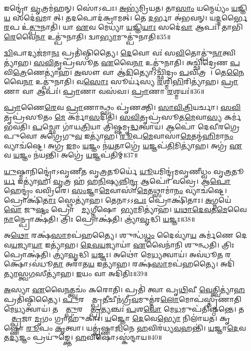𑌇𑌨𑍍𑌦𑍍𑌰𑍋॑ \ul{𑌵𑍃}𑌤𑍍𑌰𑌮॑𑌹𑌨𑍍।
𑌸𑍋॑𑌽𑌪𑌃।
\ul{𑌅}𑌭𑍍𑌯॑𑌮𑍍𑌰𑌿𑌯𑌤।
𑌤𑌾\ul{𑌸𑌾𑌂} 𑌯𑌨𑍍𑌮𑍇𑌧𑍍𑌯𑌂॑ \ul{𑌯}𑌜𑍍𑌞𑌿\ul{𑌯}\ul{} 𑌸𑌦𑍇॑\ul{𑌵}𑌮𑌾𑌸𑍀᳚𑌤𑍍।
𑌤𑌦𑌪𑍋𑌦॑𑌕𑍍𑌰𑌾𑌮𑌤𑍍।
𑌤𑍇 \ul{𑌦}𑌰𑍍𑌭𑌾 𑌅॑𑌭𑌵𑌨𑍍।
𑌯\ul{𑌦𑍍𑌦}𑌰𑍍𑌭𑍈\ul{𑌰}𑌪 𑌉॑\ul{𑌤𑍍𑌪𑍁}𑌨𑌾𑌤𑌿॑।
𑌯𑌾 \ul{𑌏}𑌵 𑌮𑍇𑌧𑍍𑌯𑌾॑ \ul{𑌯}𑌜𑍍𑌞𑌿\ul{𑌯𑌾𑌃} 𑌸𑌦𑍇॑\ul{𑌵𑌾} 𑌆𑌪𑌃॑।
𑌤𑌾𑌭𑌿॑\ul{𑌰𑍇}𑌵𑍈\ul{𑌨𑌾} 𑌉𑌤𑍍𑌪𑍁॑𑌨𑌾𑌤𑌿।
𑌦𑍍𑌵𑌾\ul{𑌭𑍍𑌯𑌾}𑌮𑍁𑌤𑍍𑌪𑍁॑𑌨𑌾𑌤𑌿॥35॥

\ul{𑌦𑍍𑌵𑌿}𑌪𑌾𑌦𑍍𑌯𑌜॑𑌮𑌾\ul{𑌨𑌃} 𑌪𑍍𑌰𑌤𑌿॑\-𑌷𑍍𑌠𑌿𑌤𑍍𑌯𑍈।
\ul{𑌦𑍇}𑌵𑍋 𑌵𑌃॑ 𑌸\ul{𑌵𑌿}𑌤𑍋𑌤𑍍𑌪𑍁॑\ul{𑌨𑌾}𑌤𑍍𑌵𑌿𑌤𑍍𑌯𑌾॑𑌹।
\ul{𑌸}\ul{𑌵𑌿}𑌤𑍃𑌪𑍍𑌰॑𑌸𑍂𑌤 \ul{𑌏}𑌵𑍈\ul{𑌨𑌾} 𑌉𑌤𑍍𑌪𑍁॑𑌨𑌾𑌤𑌿।
𑌅𑌚𑍍𑌛𑌿॑𑌦𑍍𑌰𑍇𑌣 \ul{𑌪}𑌵𑌿\ul{𑌤𑍍𑌰𑍇}𑌣𑍇𑌤𑍍𑌯𑌾॑𑌹।
\ul{𑌅}𑌸𑍗 𑌵𑌾 𑌆॑\ul{𑌦𑌿}𑌤𑍍𑌯𑍋\-𑌽𑌚𑍍𑌛𑌿॑𑌦𑍍𑌰𑌂 \ul{𑌪}𑌵𑌿𑌤𑍍𑌰𑌮𑍍᳚।
𑌤𑍇\ul{𑌨𑍈}𑌵𑍈\ul{𑌨𑌾} 𑌉𑌤𑍍𑌪𑍁॑𑌨𑌾𑌤𑌿।
𑌵\ul{𑌸𑍋𑌃} 𑌸𑍂𑌰𑍍𑌯॑𑌸𑍍𑌯 \ul{𑌰}𑌶𑍍𑌮𑌿\ul{𑌭𑌿}𑌰𑌿𑌤𑍍𑌯𑌾॑𑌹।
\ul{𑌪𑍍𑌰𑌾}𑌣𑌾 𑌵𑌾 𑌆𑌪𑌃॑।
\ul{𑌪𑍍𑌰𑌾}𑌣𑌾 𑌵𑌸॑𑌵𑌃।
\ul{𑌪𑍍𑌰𑌾}𑌣𑌾 \ul{𑌰}𑌶𑍍𑌮𑌯𑌃॑॥36॥

\ul{𑌪𑍍𑌰𑌾}𑌣𑍈\ul{𑌰𑍇}𑌵 \ul{𑌪𑍍𑌰𑌾}𑌣𑌾𑌨𑍍𑌥𑍍𑌸𑌂 𑌪𑍃॑𑌣𑌕𑍍𑌤𑌿।
\ul{𑌸𑌾}\ul{𑌵𑌿}\ul{𑌤𑍍𑌰𑌿}𑌯𑌰𑍍𑌚𑌾।
\ul{𑌸}\ul{𑌵𑌿}𑌤𑍃𑌪𑍍𑌰॑𑌸𑍂𑌤𑌂 \ul{𑌮𑍇} 𑌕𑌰𑍍𑌮𑌾॑\ul{𑌸}𑌦𑌿𑌤𑌿॑।
\ul{𑌸}\ul{𑌵𑌿}𑌤𑍃𑌪𑍍𑌰॑𑌸𑍂𑌤\ul{𑌮𑍇}𑌵𑌾\ul{𑌸𑍍𑌯} 𑌕𑌰𑍍𑌮॑ 𑌭𑌵𑌤𑌿।
\ul{𑌪}𑌚𑍍𑌛𑍋 𑌗𑌾॑𑌯\ul{𑌤𑍍𑌰𑌿}𑌯𑌾 𑌤𑍍𑌰𑌿॑𑌷𑍍𑌷𑌮𑍃\ul{𑌦𑍍𑌧}𑌤𑍍𑌵𑌾𑌯॑।
𑌆𑌪𑍋॑ 𑌦𑍇𑌵𑍀𑌰𑌗𑍍𑌰𑍇𑌪𑍁𑌵𑍋 𑌅𑌗𑍍𑌰𑍇𑌗𑍁\ul{𑌵} 𑌇𑌤𑍍𑌯𑌾॑𑌹।
\ul{𑌰𑍂}𑌪\ul{𑌮𑍇}𑌵𑌾𑌸𑌾॑\ul{𑌮𑍇}𑌤𑌨𑍍𑌮॑\ul{𑌹𑌿}𑌮𑌾\ul{𑌨𑌂} 𑌵𑍍𑌯𑌾𑌚॑𑌷𑍍𑌟𑍇।
𑌅𑌗𑍍𑌰॑ \ul{𑌇}𑌮𑌂 \ul{𑌯}𑌜𑍍𑌞𑌂 𑌨॑\ul{𑌯}𑌤𑌾𑌗𑍍𑌰𑍇॑ \ul{𑌯}𑌜𑍍𑌞𑌪॑\ul{𑌤𑌿}𑌮𑌿𑌤𑍍𑌯𑌾॑𑌹।
𑌅𑌗𑍍𑌰॑ \ul{𑌏}𑌵 \ul{𑌯}𑌜𑍍𑌞𑌂 𑌨॑𑌯𑌨𑍍𑌤𑌿।
𑌅𑌗𑍍𑌰𑍇॑ \ul{𑌯}𑌜𑍍𑌞𑌪॑𑌤𑌿𑌮𑍍॥37॥

\ul{𑌯𑍁}𑌷𑍍𑌮𑌾𑌨𑌿𑌨𑍍𑌦𑍍𑌰𑍋॑\-𑌽𑌵𑍃𑌣𑍀𑌤 𑌵𑍃\ul{𑌤𑍍𑌰}𑌤𑍂𑌰𑍍𑌯𑍇॑ \ul{𑌯𑍂}𑌯𑌮𑌿𑌨𑍍𑌦𑍍𑌰॑𑌮𑌵𑍃𑌣𑍀𑌧𑍍𑌵𑌂 𑌵𑍃\ul{𑌤𑍍𑌰}𑌤𑍂\ul{𑌰𑍍𑌯} 𑌇𑌤𑍍𑌯𑌾॑𑌹।
\ul{𑌵𑍃}𑌤𑍍𑌰 𑌹॑ 𑌹\ul{𑌨𑌿}𑌷𑍍𑌯𑌨𑍍𑌨𑌿\ul{𑌨𑍍𑌦𑍍𑌰} 𑌆𑌪𑍋॑ 𑌵𑌵𑍍𑌰𑍇।
𑌆\ul{𑌪𑍋} 𑌹𑍇𑌨𑍍𑌦𑍍𑌰𑌂॑ 𑌵𑌵𑍍𑌰𑌿𑌰𑍇।
\ul{𑌸𑌂}𑌜𑍍𑌞𑌾\ul{𑌮𑍇}𑌵𑌾𑌸𑌾॑\ul{𑌮𑍇}𑌤𑌥𑍍𑌸𑌾𑌮𑌾॑\ul{𑌨𑌂} 𑌵𑍍𑌯𑌾𑌚॑𑌷𑍍𑌟𑍇।
𑌪𑍍𑌰𑍋𑌕𑍍𑌷𑌿॑\ul{𑌤𑌾𑌃} 𑌸𑍍𑌥𑍇𑌤𑍍𑌯𑌾॑𑌹।
𑌤𑍇𑌨𑌾𑌽𑌽\ul{𑌪𑌃} 𑌪𑍍𑌰𑍋𑌕𑍍𑌷𑌿॑𑌤𑌾𑌃।
\ul{𑌅}𑌗𑍍𑌨𑌯𑍇॑ \ul{𑌵𑍋} 𑌜𑍁\ul{𑌷𑍍𑌟𑌂} 𑌪𑍍𑌰𑍋𑌕𑍍𑌷𑌾᳚\ul{𑌮𑍍𑌯}𑌗𑍍𑌨𑍀𑌷𑍋𑌮𑌾᳚\ul{𑌭𑍍𑌯𑌾}𑌮𑌿𑌤𑍍𑌯𑌾॑𑌹।
\ul{𑌯}\ul{𑌥𑌾}\ul{𑌦𑍇}\ul{𑌵}𑌤\ul{𑌮𑍇}𑌵𑍈\ul{𑌨𑌾}𑌨𑍍𑌪𑍍𑌰𑍋𑌕𑍍𑌷॑𑌤𑌿।
𑌤𑍍𑌰𑌿𑌃 𑌪𑍍𑌰𑍋𑌕𑍍𑌷॑𑌤𑌿।
𑌤𑍍𑌰𑍍𑌯𑌾॑\ul{𑌵𑍃}𑌦𑍍𑌧𑌿 \ul{𑌯}𑌜𑍍𑌞𑌃॥38॥

𑌅\ul{𑌥𑍋} 𑌰𑌕𑍍𑌷॑\ul{𑌸𑌾}𑌮𑌪॑𑌹𑌤𑍍𑌯𑍈।
𑌶𑍁𑌨𑍍𑌧॑\ul{𑌧𑍍𑌵𑌂} 𑌦𑍈𑌵𑍍𑌯𑌾॑\ul{𑌯} 𑌕𑌰𑍍𑌮॑𑌣𑍇 𑌦𑍇𑌵\ul{𑌯}𑌜𑍍𑌯𑌾\ul{𑌯𑌾} 𑌇𑌤𑍍𑌯𑌾॑𑌹।
\ul{𑌦𑍇}\ul{𑌵}\ul{𑌯}𑌜𑍍𑌯𑌾𑌯𑌾॑ \ul{𑌏}𑌵𑍈𑌨𑌾॑𑌨𑌿 𑌶𑍁𑌨𑍍𑌧𑌤𑌿।
𑌤𑍍𑌰𑌿𑌃 𑌪𑍍𑌰𑍋𑌕𑍍𑌷॑𑌤𑌿।
𑌤𑍍𑌰𑍍𑌯𑌾॑\ul{𑌵𑍃}𑌦𑍍𑌧𑌿 \ul{𑌯}𑌜𑍍𑌞𑌃।
𑌅𑌥𑍋॑ 𑌮𑍇\ul{𑌧𑍍𑌯}𑌤𑍍𑌵𑌾𑌯॑।
𑌅𑌵॑𑌧𑍂\ul{𑌤}\ul{} 𑌰𑌕𑍍𑌷𑍋\-𑌽𑌵॑𑌧𑍂\ul{𑌤𑌾} 𑌅𑌰𑌾॑𑌤\ul{𑌯} 𑌇𑌤𑍍𑌯𑌾॑𑌹।
𑌰𑌕𑍍𑌷॑\ul{𑌸𑌾}𑌮𑌪॑𑌹𑌤𑍍𑌯𑍈।
𑌅𑌦𑌿॑\ul{𑌤𑍍𑌯𑌾}𑌸𑍍𑌤𑍍𑌵\ul{𑌗}𑌸𑍀𑌤𑍍𑌯𑌾॑𑌹।
\ul{𑌇}𑌯𑌂 𑌵𑌾 𑌅𑌦𑌿॑𑌤𑌿𑌃॥39॥

\ul{𑌅}𑌸𑍍𑌯𑌾 \ul{𑌏}𑌵𑍈\ul{𑌨}𑌤𑍍𑌤𑍍𑌵𑌚𑌂॑ 𑌕𑌰𑍋𑌤𑌿।
𑌪𑍍𑌰𑌤𑌿॑ 𑌤𑍍𑌵𑌾 𑌪𑍃\ul{𑌥𑌿}𑌵𑍀 \ul{𑌵𑍇}𑌤𑍍𑌤𑍍𑌵𑌿𑌤𑍍𑌯𑌾॑\ul{𑌹} 𑌪𑍍𑌰𑌤𑌿॑\-𑌷𑍍𑌠𑌿𑌤𑍍𑌯𑍈।
\ul{𑌪𑍁}𑌰𑌸𑍍𑌤𑌾᳚𑌤𑍍𑌪𑍍𑌰\ul{𑌤𑍀}𑌚𑍀𑌨॑𑌗𑍍𑌰𑍀\ul{𑌵}𑌮𑍁𑌤𑍍𑌤॑𑌰\ul{𑌲𑍋}𑌮𑍋𑌪॑𑌸𑍍𑌤𑍃𑌣𑌾𑌤𑌿 𑌮𑍇\ul{𑌧𑍍𑌯}𑌤𑍍𑌵𑌾𑌯॑।
𑌤𑌸𑍍𑌮𑌾᳚\ul{𑌤𑍍𑌪𑍁}𑌰𑌸𑍍𑌤𑌾᳚\ul{𑌤𑍍𑌪𑍍𑌰}𑌤𑍍𑌯𑌞𑍍𑌚𑌃॑ \ul{𑌪}𑌶\ul{𑌵𑍋} 𑌮𑍇\ul{𑌧}𑌮𑍁𑌪॑𑌤𑌿𑌷𑍍𑌠𑌨𑍍𑌤𑍇।
𑌤𑌸𑍍𑌮𑌾᳚\ul{𑌤𑍍𑌪𑍍𑌰}𑌜𑌾 \ul{𑌮𑍃}𑌗𑌂 𑌗𑍍𑌰𑌾𑌹𑍁॑𑌕𑌾𑌃।
\ul{𑌯}𑌜𑍍𑌞𑍋 \ul{𑌦𑍇}𑌵𑍇\ul{𑌭𑍍𑌯𑍋} 𑌨𑌿𑌲𑌾॑𑌯𑌤।
𑌕𑍃𑌷𑍍𑌣𑍋॑ \ul{𑌰𑍂}𑌪𑌂 \ul{𑌕𑍃}𑌤𑍍𑌵𑌾।
𑌯𑌤𑍍𑌕𑍃॑𑌷𑍍𑌣𑌾\ul{𑌜𑌿}𑌨𑍇 \ul{𑌹}𑌵𑌿𑌰॑𑌧𑍍𑌯\ul{𑌵}𑌹𑌨𑍍𑌤𑌿॑।
\ul{𑌯}𑌜𑍍𑌞𑌾\ul{𑌦𑍇}𑌵 𑌤\ul{𑌦𑍍𑌯}𑌜𑍍𑌞𑌂 𑌪𑍍𑌰𑌯𑍁॑𑌙𑍍𑌕𑍍𑌤𑍇।
\ul{𑌹}𑌵𑌿𑌷𑍋\-𑌽𑌸𑍍𑌕॑𑌨𑍍𑌦𑌾𑌯॥40॥

